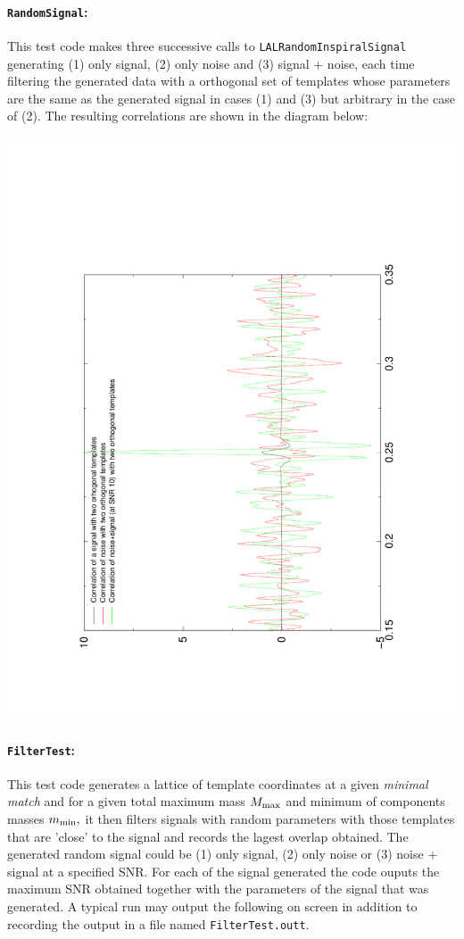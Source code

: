\paragraph* {\texttt{RandomSignal}:} This test code makes three
successive calls to \texttt{LALRandomInspiralSignal} generating
(1) only signal, (2) only noise and (3) signal + noise, each
time filtering the generated data with a orthogonal set of templates
whose parameters are the same as the generated signal in
cases (1) and (3) but arbitrary in the case of (2). The resulting
correlations are shown in the diagram below:
\begin{center}
\includegraphics[angle=-90,width=4truein]{RandomSignal.pdf}
\end{center}
\paragraph* {\texttt{FilterTest}:} This test code generates
a lattice of template coordinates at a given {\it minimal match}
and for a given total maximum mass $M_{\rm max}$ and minimum of components
masses $m_{\rm min},$ it then filters signals with random parameters
with those templates that are 'close' to the signal and records
the lagest overlap obtained. The generated random signal could
be (1) only signal, (2) only noise or (3) noise + signal at a specified
SNR. For each of the signal generated the code ouputs the maximum
SNR obtained together with the parameters of the signal that was
generated. A typical run may output the following on screen in
addition to recording the output in a file named \texttt{FilterTest.outt}.


